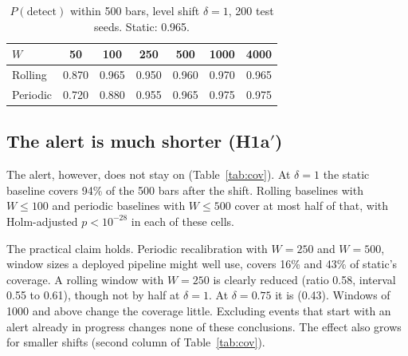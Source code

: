 \documentclass[11pt]{article}
\begin{document}
\begin{table}[t]
\centering
\caption{$P(\text{detect})$ within 500 bars, level shift $\delta=1$, 200 test seeds. Static: 0.965.}
\label{tab:detect}
\begin{tabular}{lcccccc}
\toprule
$W$ & 50 & 100 & 250 & 500 & 1000 & 4000\\
\midrule
Rolling & 0.870 & 0.965 & 0.950 & 0.960 & 0.970 & 0.965\\
Periodic & 0.720 & 0.880 & 0.955 & 0.965 & 0.975 & 0.975\\
\bottomrule
\end{tabular}
\end{table}

\subsection{The alert is much shorter (H1a$'$)}

The alert, however, does not stay on (Table~\ref{tab:cov}). At $\delta=1$ the static baseline covers 94\% of the 500 bars after the shift. Rolling baselines with $W\le100$ and periodic baselines with $W\le500$ cover at most half of that, with Holm-adjusted $p<10^{-28}$ in each of these cells.

The practical claim holds. Periodic recalibration with $W=250$ and $W=500$, window sizes a deployed pipeline might well use, covers 16\% and 43\% of static's coverage. A rolling window with $W=250$ is clearly reduced (ratio 0.58, interval 0.55 to 0.61), though not by half at $\delta=1$. At $\delta=0.75$ it is (0.43). Windows of 1000 and above change the coverage little. Excluding events that start with an alert already in progress changes none of these conclusions. The effect also grows for smaller shifts (second column of Table~\ref{tab:cov}).
\end{document}
